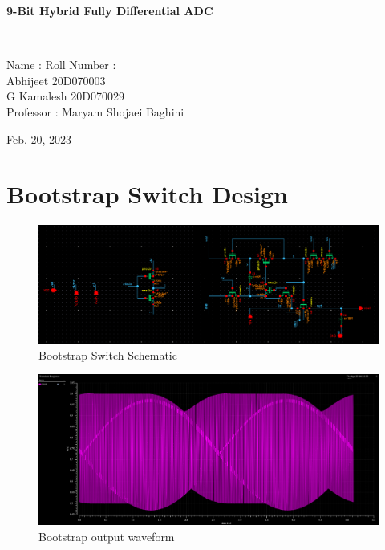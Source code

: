 \documentclass[a4paper,12pt]{article}
\begin{document}
\begin{center}
    \hline
    \vspace{0.5em}
    
    \textbf{\huge{9-Bit Hybrid Fully Differential ADC }}\\
    \vspace{0.5em}
    
    \hline\\
    
    \vspace{2em}

    Name : \hfill{Roll Number :}\\
    Abhijeet \hfill{20D070003}\\
    G Kamalesh \hfill{20D070029}\\

    \vspace{1em}
    Professor : \hfill{Maryam Shojaei Baghini}\\
    

    \vspace{2em}

   Feb. 20, 2023
    

    
\end{center}

\newpage

\section{Bootstrap Switch Design}
\begin{figure}[H]
    \centering
    \includegraphics[scale=0.5]{Images/bootstrap_sch.png}
    \caption{Bootstrap Switch Schematic}
    \label{fig:enter-label}
\end{figure}

\begin{figure}[H]
    \centering
    \includegraphics[max width = \textwidth]{Images/bootstrap_out.png}
    \caption{Bootstrap output waveform}
    \label{fig:enter-label}
\end{figure}
\end{document}
